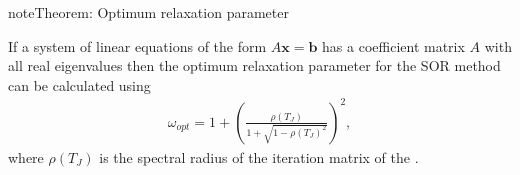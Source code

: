 \documentclass[letterpaper,10pt,english]{jupyterBook}
\begin{document}
\begin{sphinxadmonition}{note}{Theorem: Optimum relaxation parameter}

\sphinxAtStartPar
If a system of linear equations of the form \(A\mathbf{x}=\mathbf{b}\) has a coefficient matrix \(A\) with all real eigenvalues then the optimum relaxation parameter for the SOR method can be calculated using
\begin{equation}\label{equation:7_Indirect_methods/7.4_SOR_method:optimum-relaxation-parameter-equation}
\begin{split}\omega_{opt} = 1+{\left(\frac{\rho (T_J )}{1+\sqrt{1-\rho (T_J )^2 }}\right)}^2,\end{split}
\end{equation}
\sphinxAtStartPar
where \(\rho(T_J)\) is the spectral radius of the iteration matrix of the {\hyperref[\detokenize{7_Indirect_methods/7.1_Jacobi_method:jacobi-method-iteration-matrix-definition}]{}}.
\end{sphinxadmonition}
\end{document}
